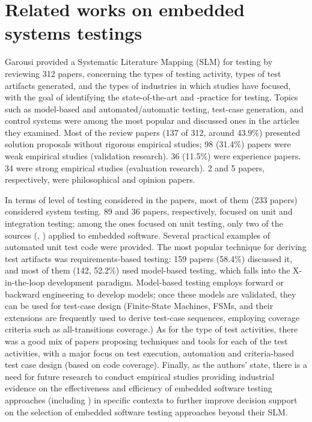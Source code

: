 \section{Related works on embedded systems testings}
Garousi \etal \cite{DBLP:journals/infsof/GarousiFKY18} provided a Systematic Literature Mapping (SLM) for \es testing by reviewing 312 papers, concerning the types of testing activity, types of test artifacts generated, and the types of industries in which studies have focused, with the goal of identifying the state-of-the-art and -practice for \ess testing.
Topics such as model-based and automated/automatic testing, test-case generation, and control systems were among the most popular and discussed ones in the articles they examined. Most of the review papers (137 of 312, around 43.9\%) presented solution proposals without rigorous empirical studies; 98 (31.4\%) papers were weak empirical studies (validation research). 36 (11.5\%) were experience papers. 34 were strong empirical studies (evaluation research). 2 and 5 papers, respectively, were philosophical and opinion papers.

In terms of level of testing considered in the papers, most of them (233 papers) considered system testing. 89 and 36 papers, respectively, focused on unit and integration testing; among the ones focused on unit testing, only two of the sources (\cite{4428578}, \cite{DBLP:conf/isese/GuanOA06}) applied \tdd to embedded software. Several practical examples of automated unit test code were provided.
The most popular technique for deriving test artifacts was requirements-based testing: 159 papers (58.4\%) discussed it, and most of them (142, 52.2\%) used model-based testing, which falls into the X-in-the-loop development paradigm.
Model-based testing employs forward or backward engineering to develop models; once these models are validated, they can be used for test-case design (\eg Finite-State Machines, FSMs, and their extensions are frequently used to derive test-case sequences, employing coverage criteria such as all-transitions coverage.)
As for the type of test activities, there was a good mix of papers proposing techniques and tools for each of the test activities, with a major focus on test execution, automation and criteria-based test case design (\eg based on code coverage).
Finally, as the authors' state, there is a need for future research to conduct empirical studies providing industrial evidence on the effectiveness and efficiency of embedded software testing approaches (including \tdd) in specific contexts to further improve decision support on the selection of embedded software testing approaches beyond their SLM.
